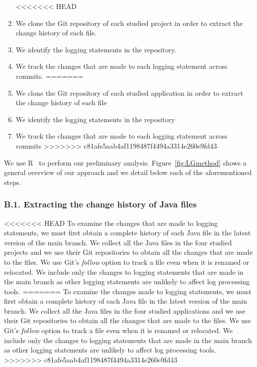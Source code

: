 \begin{enumerate}
<<<<<<< HEAD
\item We clone the Git repository of each studied project in order to extract the change history of each file.
\item We identify the logging statements in the repository.%
\item We track the changes that are made to each logging statement across commits.
=======
\item We clone the Git repository of each studied application in order to extract the change history of each file 
\item We identify the logging statements in the repository%
\item We track the changes that are made to each logging statement across commits 
>>>>>>> c81afe5aab4af1198487f4494a3314e260e9fd43
\end{enumerate}

We use R~\cite{ihaka1996r} to perform our preliminary analysis. Figure~\ref{fig:LGmethod} shows a general overview of our approach and we detail below each of the aforementioned steps. 

\subsubsection*{B.1. Extracting the change history of Java files} 
<<<<<<< HEAD
To examine the changes that are made to logging statements, we must first obtain a complete history of each Java file in the latest version of the main branch.
We collect all the Java files in the four studied projects and we use their Git repositories to obtain all the changes that are made to the files. We use Git's \emph{follow} option to track a file even when it is renamed or relocated. We include only the changes to logging statements that are made in the main branch as other logging statements are unlikely to affect log processing tools. %
=======
To examine the changes made to logging statements, we must first obtain a complete history of each Java file in the latest version of the main branch.
We collect all the Java files in the four studied applications and we use their Git repositories to obtain all the changes that are made to the files. We use Git's \emph{follow} option to track a file even when it is renamed or relocated. We include only the changes to logging statements that are made in the main branch as other logging statements are unlikely to affect log processing tools. %
>>>>>>> c81afe5aab4af1198487f4494a3314e260e9fd43

